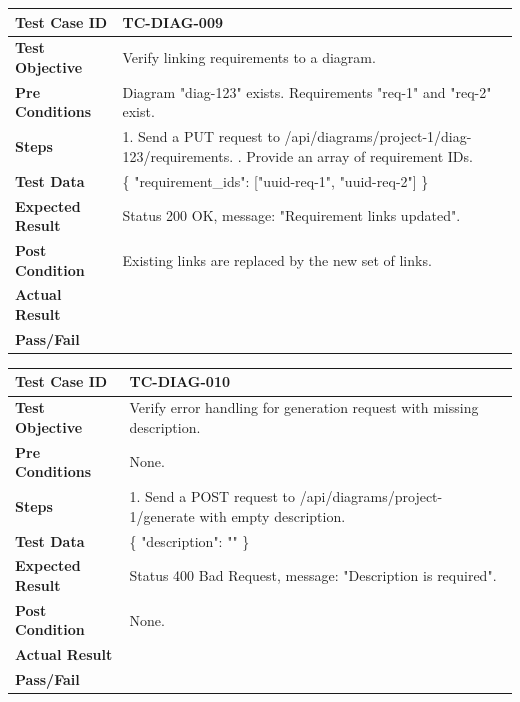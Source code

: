 \begin{longtable}{|p{}|p{}|}
\hline
\textbf{Test Case ID} & TC-DIAG-009 \\ \hline
\textbf{Test Objective} & Verify linking requirements to a diagram. \\ \hline
\textbf{Pre Conditions} & Diagram "diag-123" exists. Requirements "req-1" and "req-2" exist. \\ \hline
\textbf{Steps} & 
1. Send a PUT request to /api/diagrams/project-1/diag-123/requirements. \newline
2. Provide an array of requirement IDs. \\ \hline
\textbf{Test Data} & \{ "requirement\_ids": ["uuid-req-1", "uuid-req-2"] \} \\ \hline
\textbf{Expected Result} & Status 200 OK, message: "Requirement links updated". \\ \hline
\textbf{Post Condition} & Existing links are replaced by the new set of links. \\ \hline
\textbf{Actual Result} &  \\ \hline
\textbf{Pass/Fail} &  \\ \hline
\end{longtable}

\begin{longtable}{|p{}|p{}|}
\hline
\textbf{Test Case ID} & TC-DIAG-010 \\ \hline
\textbf{Test Objective} & Verify error handling for generation request with missing description. \\ \hline
\textbf{Pre Conditions} & None. \\ \hline
\textbf{Steps} & 
1. Send a POST request to /api/diagrams/project-1/generate with empty description. \\ \hline
\textbf{Test Data} & \{ "description": "" \} \\ \hline
\textbf{Expected Result} & Status 400 Bad Request, message: "Description is required". \\ \hline
\textbf{Post Condition} & None. \\ \hline
\textbf{Actual Result} &  \\ \hline
\textbf{Pass/Fail} &  \\ \hline
\end{longtable}